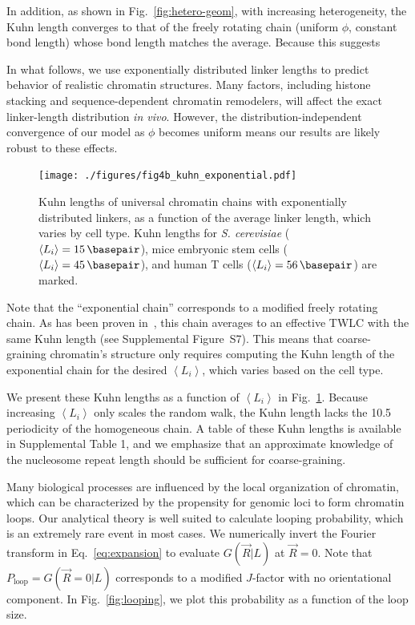 \documentclass[%
 reprint,
superscriptaddress,
showpacs,preprintnumbers,
 amsmath,amssymb,
 aps,
 prl,
]{revtex4-1}
\newcommand{\greens}[2][\Omega_0; L]{G(#2|#1)}
\newcommand{\meanli}{\left\langle{}L_i\right\rangle}
\begin{document}
In addition, as shown in Fig.~\ref{fig:hetero-geom}, with increasing
    heterogeneity, the Kuhn length converges to that of the freely rotating
    chain (uniform $\phi$, constant bond length) whose bond length matches the
    average.
Because this suggests

In what follows, we use exponentially distributed linker lengths to predict
    behavior of realistic chromatin structures.
Many factors, including histone stacking and sequence-dependent chromatin
    remodelers, will affect the exact linker-length distribution \textit{in vivo}.
However, the distribution-independent convergence of our model as $\phi$ becomes
    uniform means our results are likely robust to these effects.

\begin{figure}
    \centering
    \texttt{[image: ./figures/fig4b\_kuhn\_exponential.pdf]}
    \caption{Kuhn lengths of universal chromatin chains with exponentially
    distributed linkers, as a function of the average linker length, which
    varies by cell type. Kuhn lengths for \textit{S. cerevisiae}
    ($\meanli=\SI{15}{\basepair}$), mice embryonic stem cells
    ($\meanli=\SI{45}{\basepair}$), and human T cells
    ($\meanli=\SI{56}{\basepair}$) are marked.}\label{fig:exp-chain}
\end{figure}

Note that the ``exponential chain'' corresponds to a modified freely rotating
    chain.
As has been proven in~\cite{kilanowski2017}, this chain averages to an effective
    TWLC with the same Kuhn length (see Supplemental Figure~S7).
This means that coarse-graining chromatin's structure only requires computing
    the Kuhn length of the exponential chain for the desired $\meanli$, which
    varies based on the cell type.

We present these Kuhn lengths as a function of $\meanli$ in
    Fig.~\ref{fig:exp-chain}.
Because increasing $\meanli$ only scales the random walk, the Kuhn length lacks
    the \SI{10.5}{\basepair} periodicity of the homogeneous chain.
A table of these Kuhn lengths is available in Supplemental Table 1, and we
    emphasize that an approximate knowledge of the nucleosome repeat length should
    be sufficient for coarse-graining.

Many biological processes are influenced by the local organization of chromatin,
    which can be characterized by the propensity for genomic loci to form
    chromatin loops.
Our analytical theory is well suited to calculate looping probability, which is an
    extremely rare event in most cases.
We numerically invert the Fourier transform in Eq.~\ref{eq:expansion} to evaluate
    $\greens[L]{\vec{R}}$ at $\vec{R} = 0$.
Note that $P_\text{loop}=\greens[L]{\vec{R}=0}$ corresponds to a modified
    $J$-factor with no orientational component.
In Fig.~\ref{fig:looping}, we plot this probability as a function of the loop size.
\end{document}
